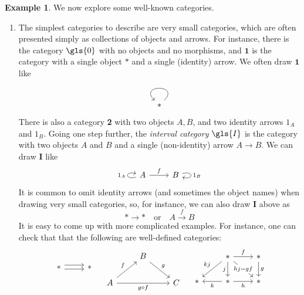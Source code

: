 \documentclass[10pt,oneside]{book}
\def\To#1{\xrightarrow{#1}}
\theoremstyle{plain}
\theoremstyle{definition}
\newtheorem{ex}[thm]{Example}
\theoremstyle{remark}
\numberwithin{equation}{section}
\numberwithin{figure}{section}
\begin{document}
\begin{ex} \label{ex:all_the_categories} We now explore some well-known categories.
\begin{enumerate}[label=(\roman*)]
        \item The simplest categories to describe are very small categories, which are often presented simply as collections of objects and arrows. For instance, there is the category $\gls{0}$ with no objects and no morphisms, and $\mathbf{1}$ is the category with a single object $\ast$ and a single (identity) arrow. We often draw $\mathbf{1}$ like
        \[\begin{tikzcd}
        \ast \arrow[loop,swap,looseness=6] 
        \end{tikzcd}\]
        There is also a category \textbf{2} with two objects $A, B$, and two identity arrows $1_A$ and $1_B$. Going one step further, the \emph{interval category} $\gls{I}$ is the category with two objects $A$ and $B$ and a single (non-identity) arrow $A \to B$. We can draw $\mathbf{I}$ like
        \[\begin{tikzcd}
        A \arrow[loop left]{}{1_A} \arrow{r}{f} & B \arrow[loop right]{}{1_B}
        \end{tikzcd}\]
        It is common to omit identity arrows (and sometimes the object names) when drawing very small categories, so, for instance, we can also draw $\mathbf{I}$ above as
            \[\ast \to \ast \quad \text{or} \quad A \To{f} B\]
        It is easy to come up with more complicated examples. For instance, one can check that that the following are well-defined categories:
        \[\begin{tikzcd}
            \ast & \ast
            \arrow[shift left=1, from=1-1, to=1-2]
            \arrow[shift right=1, from=1-1, to=1-2]
        \end{tikzcd} \quad \begin{tikzcd}
        & B \\
        A && C
        \arrow["f", from=2-1, to=1-2]
        \arrow["g", from=1-2, to=2-3]
        \arrow["g \circ f"', from=2-1, to=2-3]
        \end{tikzcd} \quad \begin{tikzcd}
    & \ast & \ast \\
    \ast & \ast & \ast
    \arrow["kj"', from=1-2, to=2-1]
    \arrow["j"', from=1-2, to=2-2]
    \arrow["{hj=gf}"{description}, from=1-2, to=2-3]
    \arrow["f", from=1-2, to=1-3]
    \arrow["g", from=1-3, to=2-3]
    \arrow["h"', from=2-2, to=2-3]
    \arrow["k", from=2-2, to=2-1]
\end{tikzcd}\]
        

\end{enumerate}
\end{ex}
\end{document}
